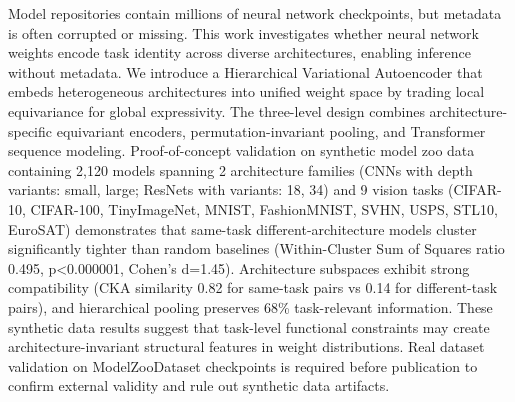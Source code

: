 
Model repositories contain millions of neural network checkpoints, but metadata is often corrupted or missing. This work investigates whether neural network weights encode task identity across diverse architectures, enabling inference without metadata. We introduce a Hierarchical Variational Autoencoder that embeds heterogeneous architectures into unified weight space by trading local equivariance for global expressivity. The three-level design combines architecture-specific equivariant encoders, permutation-invariant pooling, and Transformer sequence modeling. Proof-of-concept validation on synthetic model zoo data containing 2,120 models spanning 2 architecture families (CNNs with depth variants: small, large; ResNets with variants: 18, 34) and 9 vision tasks (CIFAR-10, CIFAR-100, TinyImageNet, MNIST, FashionMNIST, SVHN, USPS, STL10, EuroSAT) demonstrates that same-task different-architecture models cluster significantly tighter than random baselines (Within-Cluster Sum of Squares ratio 0.495, p<0.000001, Cohen's d=1.45). Architecture subspaces exhibit strong compatibility (CKA similarity 0.82 for same-task pairs vs 0.14 for different-task pairs), and hierarchical pooling preserves 68\% task-relevant information. These synthetic data results suggest that task-level functional constraints may create architecture-invariant structural features in weight distributions. Real dataset validation on ModelZooDataset checkpoints is required before publication to confirm external validity and rule out synthetic data artifacts.

